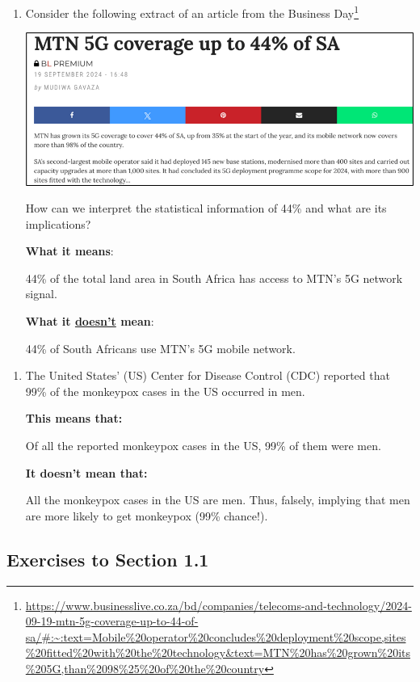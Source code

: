 \documentclass[
]{book}
\begin{document}
\begin{enumerate}
\def\labelenumi{\arabic{enumi}.}
\item
  Consider the following extract of an article from the Business Day\footnote{\url{https://www.businesslive.co.za/bd/companies/telecoms-and-technology/2024-09-19-mtn-5g-coverage-up-to-44-of-sa/\#:~:text=Mobile\%20operator\%20concludes\%20deployment\%20scope,sites\%20fitted\%20with\%20the\%20technology&text=MTN\%20has\%20grown\%20its\%205G,than\%2098\%25\%20of\%20the\%20country}}

  \includegraphics[width=5.20833in,height=\textheight]{images/clipboard-338848850.png}

  How can we interpret the statistical information of 44\% and what are its implications?

  \textbf{What it means}:

  44\% of the total land area in South Africa has access to MTN's 5G network signal.

  \textbf{What it \ul{doesn't} mean}:

  44\% of South Africans use MTN's 5G mobile network.
\end{enumerate}

\begin{enumerate}
\def\labelenumi{\arabic{enumi}.}
\setcounter{enumi}{1}
\item
  The United States' (US) Center for Disease Control (CDC) reported that 99\% of the monkeypox cases in the US occurred in men.

  \textbf{This means that:}

  Of all the reported monkeypox cases in the US, 99\% of them were men.

  \textbf{It doesn't mean that:}

  All the monkeypox cases in the US are men. Thus, falsely, implying that men are more likely to get monkeypox (99\% chance!).
\end{enumerate}

\subsection{Exercises to Section 1.1}\label{exercises-to-section-1.1}
\end{document}

